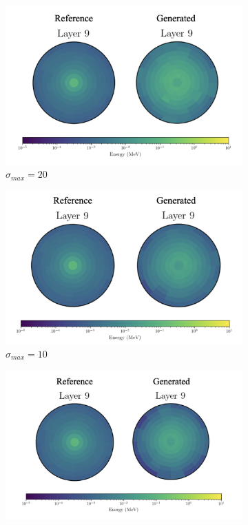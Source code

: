\begin{figure}
    \centering
    \begin{subfigure}[b]{0.23\textwidth}
        \centering
        \includegraphics[width=\textwidth]{Figures/ve20_6.png}
        \caption{$\sigma_{max}=20$}
        \label{fig:ve20_6}
    \end{subfigure}
    \hfill
    \begin{subfigure}[b]{0.23\textwidth}
        \centering
        \includegraphics[width=\textwidth]{Figures/ve10_6.png}
        \caption{$\sigma_{max}=10$}
        \label{fig:ve10_6}
    \end{subfigure}
    \hfill
    \begin{subfigure}[b]{0.23\textwidth}
        \centering
        \includegraphics[width=\textwidth]{Figures/ve5_6.png}

\end{subfigure}
\end{figure}
